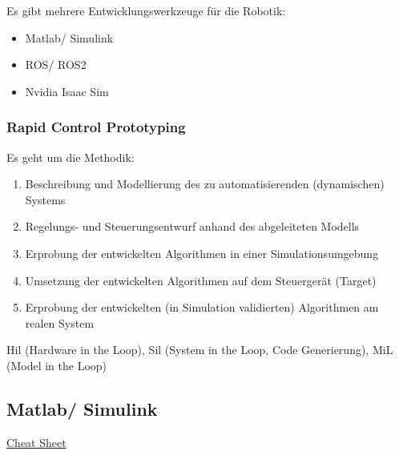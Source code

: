 \documentclass[a4paper]{article}
\begin{document}
Es gibt mehrere Entwicklungswerkzeuge für die Robotik:

\begin{itemize}
    \item Matlab/ Simulink
    \item ROS/ ROS2
    \item Nvidia Isaac Sim
\end{itemize}

\subsubsection{Rapid Control Prototyping}

Es geht um die Methodik:

\begin{enumerate}
    \item Beschreibung und Modellierung des zu automatisierenden (dynamischen) Systems
    \item Regelungs- und Steuerungsentwurf anhand des abgeleiteten Modells
    \item Erprobung der entwickelten Algorithmen in einer Simulationsumgebung
    \item Umsetzung der entwickelten Algorithmen auf dem Steuergerät (Target)
    \item Erprobung der entwickelten (in Simulation validierten) Algorithmen am realen System
\end{enumerate}

Hil (Hardware in the Loop), Sil (System in the Loop, Code Generierung), MiL (Model in the Loop)

\subsection{Matlab/ Simulink}

\href{https://de.mathworks.com/campaigns/offers/matlab-basic-functions-reference-cheat-sheet.html}{Cheat Sheet}
\end{document}
